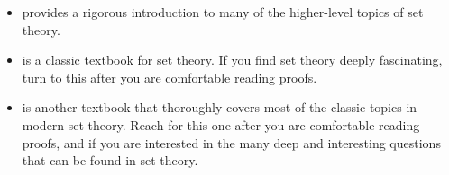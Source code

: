 \documentclass[../../../main.tex]{subfiles}
\begin{document}
\begin{itemize}
  \item \citet[chs.~4--5]{Jongsma2019} provides a rigorous introduction to many of the higher-level topics of set theory.
  
  \item \citet{Enderton1977} is a classic textbook for set theory. If you find set theory deeply fascinating, turn to this after you are comfortable reading proofs.
  
  \item \citet{SmullyanAndFitting2010} is another textbook that thoroughly covers most of the classic topics in modern set theory. Reach for this one after you are comfortable reading proofs, and if you are interested in the many deep and interesting questions that can be found in set theory.

\end{itemize}
\end{document}
